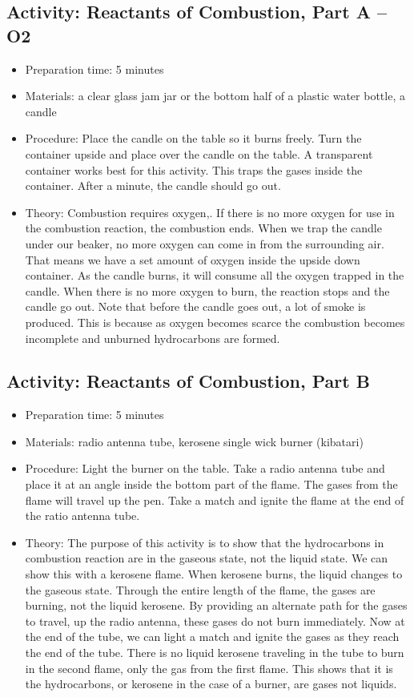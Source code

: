 \begin{itemize}
{\subsection{Activity: Reactants of Combustion, Part A – O2}
\begin{itemize}
\item{Preparation time: 5 minutes}
\item{Materials: a clear glass jam jar or the bottom half of a plastic water bottle, a candle}
\item{Procedure: Place the candle on the table so it burns freely. Turn the container upside and place over the candle on the table. A transparent container works best for this activity. This traps the gases inside the container. After a minute, the candle should go out.}
\item{Theory:  Combustion requires oxygen,. If there is no more oxygen for use in the combustion reaction, the combustion ends. When we trap the candle under our beaker, no more oxygen can come in from the surrounding air. That means we have a set amount of oxygen inside the upside down container. As the candle burns, it will consume all the oxygen trapped in the candle. When there is no more oxygen to burn, the reaction stops and the candle go out. Note that before the candle goes out, a lot of smoke is produced. This is because as oxygen becomes scarce the combustion becomes incomplete and unburned hydrocarbons are formed.}
\end{itemize}

\subsection{Activity: Reactants of Combustion, Part B}
\begin{itemize}
\item{Preparation time: 5 minutes}
\item{Materials: radio antenna tube, kerosene single wick burner (kibatari)}
\item{Procedure: Light the burner on the table. Take a radio antenna tube and place it at an angle inside the bottom part of the flame. The gases from the flame will travel up the pen. Take a match and ignite the flame at the end of the ratio antenna tube. }
\item{Theory: The purpose of this activity is to show that the hydrocarbons in combustion reaction are in the gaseous state, not the liquid state. We can show this with a kerosene flame. When kerosene burns, the liquid changes to the gaseous state. Through the entire length of the flame, the gases are burning, not the liquid kerosene. By providing an alternate path for the gases to travel, up the radio antenna, these gases do not burn immediately. Now at the end of the tube, we can light a match and ignite the gases as they reach the end of the tube. There is no liquid kerosene traveling in the tube to burn in the second flame, only the gas from the first flame. This shows that it is the hydrocarbons, or kerosene in the case of a burner, are gases not liquids. }
\end{itemize}

}
\end{itemize}
